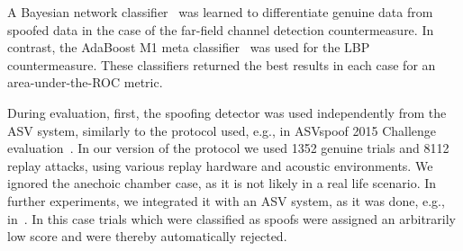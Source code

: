 A Bayesian network classifier~\cite{Pearl1988} was learned to differentiate genuine data from spoofed data in the case of the far-field channel detection countermeasure.  In contrast, the AdaBoost M1 meta classifier~\cite{Freund1999}  was used for the LBP countermeasure.  These classifiers returned the best results in each case for an area-under-the-ROC metric.  %



During evaluation, first, the spoofing detector was used independently from the ASV system, similarly to the protocol used, e.g., in ASVspoof 2015 Challenge evaluation~\cite{Wu2015}. In our version of the protocol we used 1352 genuine trials and 8112 replay attacks, using various replay hardware and acoustic environments. We ignored the anechoic chamber case, as it is not likely in a real life scenario. In further experiments, we integrated it with an ASV system, as it was done, e.g., in~\cite{Alegre2013a}. In this case trials which were classified as spoofs were assigned an arbitrarily low score and were thereby automatically rejected. 
